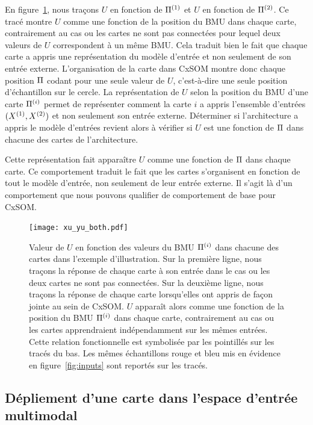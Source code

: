 \documentclass[../main]{subfiles}
\begin{document}
En figure~\ref{fig:piu}, nous traçons $U$ en fonction de $\Pi^{({1})}$ et $U$ en fonction de $\Pi^{({2})}$.
Ce tracé montre $U$ comme une fonction de la position du BMU dans chaque carte, contrairement au cas ou les cartes ne sont pas connectées pour lequel deux valeurs de $U$ correspondent à un même BMU. Cela traduit bien le fait que chaque carte a appris une représentation du modèle d'entrée et non seulement de son entrée externe.
L'organisation de la carte dans CxSOM montre donc chaque position $\Pi$ codant pour une seule valeur de $U$, c'est-à-dire une seule position d'échantillon sur le cercle.
La représentation de $U$ selon la position du BMU d'une carte $\Pi^{({i})}$ permet de représenter comment la carte $i$ a appris l'ensemble d'entrées $(X^{({1})},X^{({2})})$ et non seulement son entrée externe. Déterminer si l'architecture a appris le modèle d'entrées revient alors à vérifier si $U$ est une fonction de $\Pi$ dans chacune des cartes de l'architecture.

Cette représentation fait apparaître $U$ comme une fonction de $\Pi$ dans chaque carte. Ce comportement traduit le fait que les cartes s'organisent en fonction de tout le modèle d'entrée, non seulement de leur entrée externe. Il s'agit là d'un comportement que nous pouvons qualifier de comportement de base pour CxSOM. 

\begin{figure}
\centering
\texttt{[image: xu\_yu\_both.pdf]}
\caption{Valeur de $U$ en fonction des valeurs du BMU $\Pi^{({i})}$ dans chacune des cartes dans l'exemple d'illustration. Sur la première ligne, nous traçons la réponse de chaque carte à son entrée dans le cas ou les deux cartes ne sont pas connectées. Sur la deuxième ligne, nous traçons la réponse de chaque carte lorsqu'elles ont appris de façon jointe au sein de CxSOM.
$U$ apparaît alors comme une fonction de la position du BMU $\Pi^{({i})}$ dans chaque carte, contrairement au cas ou les cartes apprendraient indépendamment sur les mêmes entrées. Cette relation fonctionnelle est symbolisée par les pointillés sur les tracés du bas. Les mêmes échantillons rouge et bleu mis en évidence en figure~\ref{fig:inputs} sont reportés sur les tracés.}
\label{fig:piu}
\end{figure}


\subsection{Dépliement d'une carte dans l'espace d'entrée multimodal}
\end{document}
